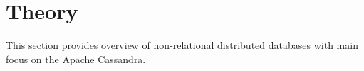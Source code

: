 
\chapter{Theory}\label{chapter:theory}









This section provides overview of non-relational distributed databases with main focus on the Apache Cassandra.





